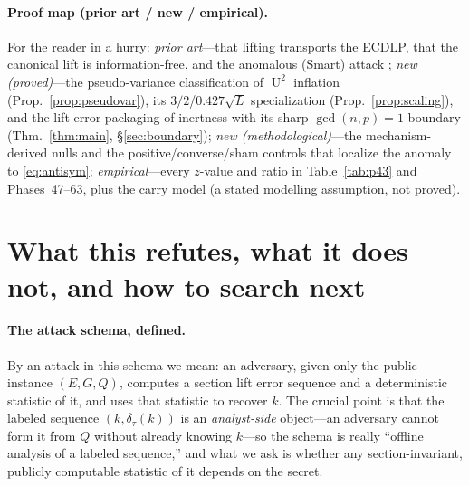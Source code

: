 \documentclass[11pt]{article}
\theoremstyle{definition}
\DeclareMathOperator{\Uk}{U}
\begin{document}
\paragraph{Proof map (prior art / new / empirical).} For the reader in a
hurry: \emph{prior art}---that lifting transports the ECDLP, that the
canonical lift is information-free, and the anomalous (Smart) attack
\cite{silvermanlift,silverman4faces,gadiyarpadma,smart,satoharaki,semaev};
\emph{new (proved)}---the pseudo-variance classification of $\Uk^2$
inflation (Prop.~\ref{prop:pseudovar}), its $3/2$/$0.427\sqrt L$
specialization (Prop.~\ref{prop:scaling}), and the lift-error packaging of
inertness with its sharp $\gcd(n,p)=1$ boundary
(Thm.~\ref{thm:main}, \S\ref{sec:boundary}); \emph{new (methodological)}---the
mechanism-derived nulls and the positive/converse/sham controls that
localize the anomaly to \eqref{eq:antisym}; \emph{empirical}---every
$z$-value and ratio in Table~\ref{tab:p43} and Phases~47--63, plus the
carry model (a stated modelling assumption, not proved).

\section{What this refutes, what it does not, and how to search next}
\label{sec:scope}

\paragraph{The attack schema, defined.} By an attack in this schema we
mean: an adversary, given only the public instance $(E,G,Q)$, computes a
section lift error sequence and a deterministic statistic of it, and uses
that statistic to recover $k$. The crucial point is that the labeled
sequence $(k,\delta_\tau(k))$ is an \emph{analyst-side} object---an
adversary cannot form it from $Q$ without already knowing $k$---so the
schema is really ``offline analysis of a labeled sequence,'' and what we
ask is whether any section-invariant, publicly computable statistic of it
depends on the secret.
\end{document}
